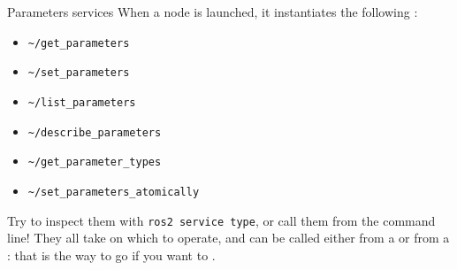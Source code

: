 \begin{frame}{Parameters services}
  When a node is launched, it  instantiates the following :
  \begin{itemize}
    \item \texttt{\textasciitilde/get\_parameters}
    \item \texttt{\textasciitilde/set\_parameters}
    \item \texttt{\textasciitilde/list\_parameters}
    \item \texttt{\textasciitilde/describe\_parameters}
    \item \texttt{\textasciitilde/get\_parameter\_types}
    \item \texttt{\textasciitilde/set\_parameters\_atomically}
  \end{itemize}
  Try to inspect them with \texttt{ros2 service type}, or call them from the command line! They all take  on which to operate, and can be called either from a  or from a : that is the way to go if you want to .
\end{frame}

